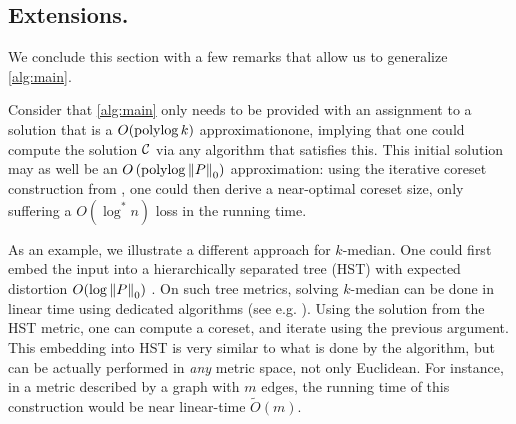 \subsection*{Extensions.} 
We conclude this section with a few remarks that allow us to generalize \cref{alg:main}.

Consider that \cref{alg:main}  only needs to be provided with an assignment to a solution that is a $O(\operatorname{polylog} k)$ approximationone, implying that one could
compute the solution $\mathcal C$ via any algorithm that satisfies this.  This initial solution may as well be an $O\left(\operatorname{polylog} \left\| P \right\|_0 \right)$
approximation: using the iterative coreset construction from \cite{BravermanJKW21}, one could then derive a near-optimal coreset size, only suffering
a $O(\log^* n)$ loss in the running time.

As an example, we illustrate a different approach for $k$-median. One could first embed the input into a hierarchically separated tree (HST) with expected
distortion $O(\log \left\| P \right\|_0)$ \cite{FakcharoenpholRT03}. On such tree metrics, solving $k$-median can be done in linear time using dedicated algorithms
(see e.g. \cite{Cohen-AddadLNSS21}). Using the solution from the HST metric, one can compute a coreset, and iterate using the previous argument.  This embedding
into HST is very similar to what is done by the \fkmeans algorithm, but can be actually performed in \emph{any} metric space, not only Euclidean.  For instance,
in a metric described by a graph with $m$ edges, the running time of this construction would be near linear-time $\tilde O(m)$.
